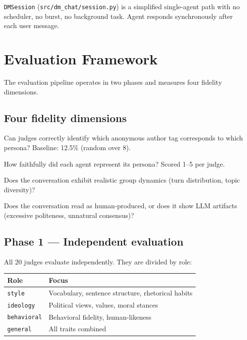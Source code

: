 \documentclass[12pt,a4paper]{article}
\begin{document}
\texttt{DMSession} (\texttt{src/dm\_chat/session.py}) is a simplified single-agent path with
no scheduler, no burst, no background task. Agent responds synchronously after each user
message.

\section{Evaluation Framework}

The evaluation pipeline operates in two phases and measures four fidelity dimensions.

\subsection{Four fidelity dimensions}

\begin{description}[leftmargin=3cm,labelwidth=2.8cm]
  \item[Persona ID] Can judges correctly identify which anonymous author tag corresponds to
        which persona? Baseline: 12.5\% (random over 8).
  \item[Individual] How faithfully did each agent represent its persona? Scored 1--5 per judge.
  \item[Group] Does the conversation exhibit realistic group dynamics (turn distribution,
        topic diversity)?
  \item[Behavioral] Does the conversation read as human-produced, or does it show LLM
        artifacts (excessive politeness, unnatural consensus)?
\end{description}

\subsection{Phase 1 --- Independent evaluation}

All 20 judges evaluate independently. They are divided by role:

\begin{tabular}{@{}ll@{}}
\toprule
\textbf{Role} & \textbf{Focus} \\
\midrule
\texttt{style}       & Vocabulary, sentence structure, rhetorical habits \\
\texttt{ideology}    & Political views, values, moral stances \\
\texttt{behavioral}  & Behavioral fidelity, human-likeness \\
\texttt{general}     & All traits combined \\
\bottomrule
\end{tabular}
\end{document}
